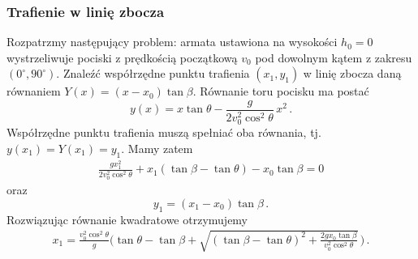 \documentclass[../main.tex]{subfiles}
\begin{document}
\subsubsection*{Trafienie w linię zbocza}
Rozpatrzmy następujący problem: armata ustawiona na wysokości \(h_0=0\) wystrzeliwuje pociski z prędkością początkową \(v_0\) pod dowolnym kątem z zakresu \((0^\circ,90^\circ)\). Znaleźć współrzędne punktu trafienia \((x_1,y_1)\) w linię zbocza daną równaniem \(Y(x)=(x-x_0)\tan\beta\). Równanie toru pocisku ma postać
\begin{equation*}
    y(x)=x\tan\theta-\frac{g}{2v_0^2\cos^2\theta}\,x^2\,.
\end{equation*}
Współrzędne punktu trafienia muszą spełniać oba równania, tj. \(y(x_1)=Y(x_1)=y_1\). Mamy zatem
\begin{equation*}
\begin{split}
    \frac{gx_1^2}{2v_0^2\cos^2\theta}+x_1(\tan\beta-\tan\theta)-x_0\tan\beta=0
\end{split}
\end{equation*}
oraz
\begin{equation*}
    y_1=(x_1-x_0)\tan\beta\,.
\end{equation*}
Rozwiązując równanie kwadratowe otrzymujemy
\begin{equation*}
\begin{split}
    x_1=\frac{v_0^2\cos^2\theta}{g}\Bigg(\tan\theta-\tan\beta+\sqrt{(\tan\beta-\tan\theta)^2+\frac{2gx_0\tan\beta}{v_0^2\cos^2\theta}}\,\Bigg)\,.
\end{split}
\end{equation*}
\end{document}
